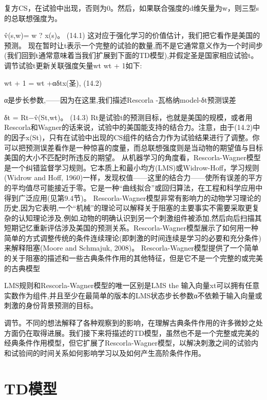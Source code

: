 复方CS，在试验中出现，否则为0。然后，如果联合强度的d维矢量为w，则三型s的总联想强度为。

v̂(s,w)= w ? x(s)。 					(14.1)
这对应于强化学习的价值估计，我们把它看作是美国的预测。
现在暂时让t表示一个完整的试验的数量,而不是它通常意义作为一个时间步(我们回到t通常意味着当我们扩展到下面的TD模型),并假定圣是国家相应试验t。调节试验t更新关联强度矢量wt wt + 1如下:

wt + 1 = wt +αδtx(圣), 					(14.2)

α是步长参数,——因为在这里,我们描述Rescorla -瓦格纳model-δt预测误差

δt = Rt−v̂(St,wt)。 					(14.3)
Rt是试验t的预测目标，也就是美国的规模，或者用Rescorla和Wagner的话来说，试验中的美国能支持的结合力。注意，由于(14.2)中的因子x(St)，只有在试验中出现的CS组件的结合力作为试验结果进行了调整。你可以把预测误差看作是一种惊喜的度量，而总联想强度则是当动物的期望值与目标美国的大小不匹配时所违反的期望。
从机器学习的角度看，Rescorla-Wagner模型是一个纠错监督学习规则。它本质上和最小均方(LMS)或Widrow-Hoff，学习规则(Widrow and Hoff, 1960)一样，发现权值——这里的结合力——使所有误差的平方的平均值尽可能接近于零。它是一种“曲线拟合”或回归算法，在工程和科学应用中得到广泛应用(见第9.4节)。
Rescorla-Wagner模型非常有影响力的动物学习理论的历史,因为它表明,一个“机械”的理论可以解释关于阻塞的主要事实不需要采取更复杂的认知理论涉及,例如,动物的明确认识到另一个刺激组件被添加,然后向后扫描其短期记忆重新评估涉及美国的预测关系。Rescorla-Wagner模型展示了如何用一种简单的方式调整传统的条件连续理论(即刺激的时间连续是学习的必要和充分条件)来解释阻塞(Moore and Schmajuk, 2008)。
Rescorla-Wagner模型提供了一个简单的关于阻塞的描述和一些古典条件作用的其他特征，但是它不是一个完整的或完美的古典模型

LMS规则和Rescorla-Wagner模型的唯一区别是LMS the
输入向量xt可以拥有任意实数作为组件,并且至少在最简单的版本的LMS状态步长参数α不依赖于输入向量或刺激的身份背景预测的目标。


调节。不同的想法解释了各种观察到的影响，在理解古典条件作用的许多微妙之处方面仍在取得进展。我们接下来将描述的TD模型，虽然也不是一个完整或完美的经典条件作用模型，但它扩展了Rescorla-Wagner模型，以解决刺激之间的试验内和试验间的时间关系如何影响学习以及如何产生高阶条件作用。

\section{TD模型}


